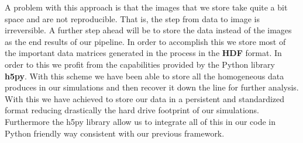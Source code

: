 \documentclass[11pt,a4paper]{article}
\begin{document}
A problem with this approach is that the images that we store take quite
a bit space and are not reproducible. That is, the step from data to
image is irreversible. A further step ahead will be to store the data
instead of the images as the end results of our pipeline. In order to accomplish this we store most of the important data matrices generated in the process in the \textbf{HDF} format. In order to this we profit from the capabilities provided by the Python library \textbf{h5py}. With this scheme we have been able to store all the homogeneous data produces in our simulations and then recover it down the line for further analysis. With this we have achieved to store our data in a persistent and standardized format reducing drastically the hard drive footprint of our simulations. Furthermore the h5py library allow us to integrate all of this in our code in Python friendly way consistent with our previous framework.




\end{document}

